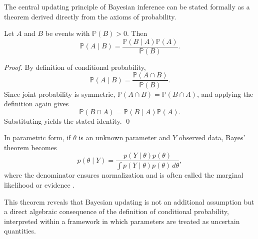 The central updating principle of Bayesian inference can be stated formally as a theorem derived directly from the axioms of probability. 

\medskip

\begin{theorem}
Let \(A\) and \(B\) be events with \(\mathbb{P}(B)>0\). Then
\[
\mathbb{P}(A \mid B) = \frac{\mathbb{P}(B \mid A)\mathbb{P}(A)}{\mathbb{P}(B)}.
\]
\end{theorem}

\medskip

\begin{proof}
By definition of conditional probability,
\[
\mathbb{P}(A \mid B) = \frac{\mathbb{P}(A \cap B)}{\mathbb{P}(B)}.
\]
Since joint probability is symmetric, \(\mathbb{P}(A \cap B) = \mathbb{P}(B \cap A)\), and applying the definition again gives
\[
\mathbb{P}(B \cap A) = \mathbb{P}(B \mid A)\mathbb{P}(A).
\]
Substituting yields the stated identity. \qed
\end{proof}

\medskip

In parametric form, if \(\theta\) is an unknown parameter and \(Y\) observed data, Bayes’ theorem becomes
\[
p(\theta \mid Y) = \frac{p(Y \mid \theta)p(\theta)}{\int p(Y \mid \theta)p(\theta)\,d\theta},
\]
where the denominator ensures normalization and is often called the marginal likelihood or evidence \cite{cox_2006_principles}. 

\medskip

This theorem reveals that Bayesian updating is not an additional assumption but a direct algebraic consequence of the definition of conditional probability, interpreted within a framework in which parameters are treated as uncertain quantities. 
